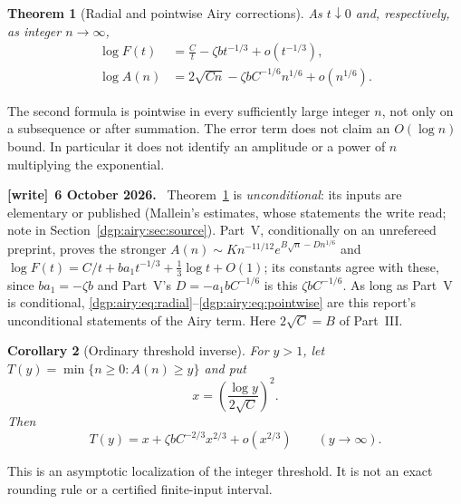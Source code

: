 \documentclass[11pt,letterpaper]{article}
\numberwithin{equation}{section}
\newtheorem{theorem}{Theorem}[section]
\newtheorem{corollary}[theorem]{Corollary}
\theoremstyle{remark}\newtheorem{remark}[theorem]{Remark}
\newenvironment{writenote}[1][]{\par\smallskip\begingroup\small
 \noindent\textbf{[write]}\if\relax\detokenize{#1}\relax\else~\textbf{#1.}\fi\ }%
 {\par\endgroup\smallskip}
\begin{document}
\begin{theorem}[Radial and pointwise Airy corrections]\label{dgp:airy:thm:airy}
As $t\downarrow0$ and, respectively, as integer $n\to\infty$,
\begin{align}
 \log F(t)&=\frac Ct-\zeta b t^{-1/3}+o(t^{-1/3}),\label{dgp:airy:eq:radial}\\
 \log A(n)&=2\sqrt{Cn}-\zeta b C^{-1/6}n^{1/6}
                                      +o(n^{1/6}).\label{dgp:airy:eq:pointwise}
\end{align}
\end{theorem}
The second formula is pointwise in every sufficiently large integer
$n$, not only on a subsequence or after summation. The error term does
not claim an $O(\log n)$ bound. In particular it does not identify an
amplitude or a power of $n$ multiplying the exponential.
\begin{writenote}[6 October 2026]
Theorem~\ref{dgp:airy:thm:airy} is \emph{unconditional}: its inputs are elementary or published (Mallein's estimates, whose statements the write read; note in Section~\ref{dgp:airy:sec:source}). Part~V, conditionally on an unrefereed preprint, proves the stronger $A(n)\sim Kn^{-11/12}e^{B\sqrt n-Dn^{1/6}}$ and $\log F(t)=C/t+ba_1t^{-1/3}+\frac13\log t+O(1)$; its constants agree with these, since $ba_1=-\zeta b$ and Part~V's $D=-a_1bC^{-1/6}$ is this $\zeta bC^{-1/6}$. As long as Part~V is conditional, \eqref{dgp:airy:eq:radial}--\eqref{dgp:airy:eq:pointwise} are this report's unconditional statements of the Airy term. Here $2\sqrt C=B$ of Part~III.
\end{writenote}

\begin{corollary}[Ordinary threshold inverse]\label{dgp:airy:cor:inverse}
For $y>1$, let $T(y)=\min\{n\geq0:A(n)\geq y\}$ and put
\[
 x=\left(\frac{\log y}{2\sqrt C}\right)^2.
\]
Then
\begin{equation}\label{dgp:airy:eq:inverse}
 T(y)=x+\zeta b C^{-2/3}x^{2/3}+o(x^{2/3})
 \qquad(y\to\infty).
\end{equation}
\end{corollary}
This is an asymptotic localization of the integer threshold. It is
not an exact rounding rule or a certified finite-input interval.
\end{document}
